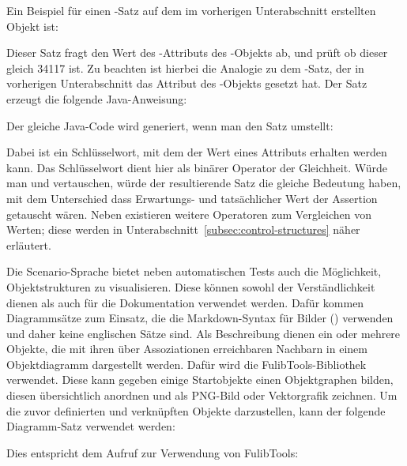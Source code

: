 Ein Beispiel für einen -Satz auf dem im vorherigen Unterabschnitt erstellten Objekt  ist:


Dieser Satz fragt den Wert des -Attributs des -Objekts ab, und prüft ob dieser gleich 34117 ist.
Zu beachten ist hierbei die Analogie zu dem -Satz, der in vorherigen Unterabschnitt das Attribut des -Objekts gesetzt hat.
Der Satz erzeugt die folgende Java-Anweisung:


Der gleiche Java-Code wird generiert, wenn man den Satz umstellt:


Dabei ist  ein Schlüsselwort, mit dem der Wert eines Attributs erhalten werden kann.
Das Schlüsselwort  dient hier als binärer Operator der Gleichheit.
Würde man  und  vertauschen, würde der resultierende Satz die gleiche Bedeutung haben,
mit dem Unterschied dass Erwartungs- und tatsächlicher Wert der Assertion getauscht wären.
Neben  existieren weitere Operatoren zum Vergleichen von Werten;
diese werden in Unterabschnitt~\ref{subsec:control-structures} näher erläutert.

Die Scenario-Sprache bietet neben automatischen Tests auch die Möglichkeit, Objektstrukturen zu visualisieren.
Diese können sowohl der Verständlichkeit dienen als auch für die Dokumentation verwendet werden.
Dafür kommen Diagrammsätze zum Einsatz, die die Markdown-Syntax für Bilder () verwenden und daher keine englischen Sätze sind.
Als Beschreibung dienen ein oder mehrere Objekte, die mit ihren über Assoziationen erreichbaren Nachbarn in einem Objektdiagramm dargestellt werden.
Dafür wird die FulibTools\cite{fulibTools}-Bibliothek verwendet.
Diese kann gegeben einige Startobjekte einen Objektgraphen bilden, diesen übersichtlich anordnen und als PNG-Bild oder Vektorgrafik zeichnen.
Um die zuvor definierten und verknüpften Objekte darzustellen, kann der folgende Diagramm-Satz verwendet werden:


Dies entspricht dem Aufruf zur Verwendung von FulibTools:


